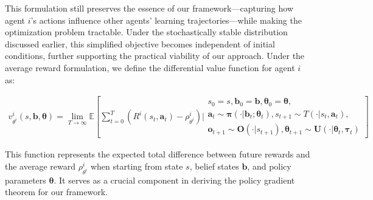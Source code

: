 \documentclass[a4paper,12pt]{report}
\begin{document}
This formulation still preserves the essence of our framework—capturing how agent $i$'s actions influence other agents' learning trajectories—while making the optimization problem tractable. Under the stochastically stable distribution discussed earlier, this simplified objective becomes independent of initial conditions, further supporting the practical viability of our approach. Under the average reward formulation, we define the differential value function for agent $i$ as:

\begin{align}
    v^i_{\theta^i}(s, \boldsymbol{b}, \boldsymbol{\theta}) = \lim_{T \to \infty} \mathbb{E}\left[ \sum_{t=0}^T \left(R^i(s_t, \boldsymbol{a}_t) - \rho^i_{\theta^i}\right) \Bigg|
    \begin{array}{c}
        s_0=s, \boldsymbol{b}_0= \boldsymbol{b}, \boldsymbol{\theta}_0= \boldsymbol{\theta}, \\
        \boldsymbol{a}_t \sim \boldsymbol{\pi}(\cdot|\boldsymbol{b}_t; \boldsymbol{\theta}_t),
        s_{t+1} \sim T(\cdot|s_t, \boldsymbol{a}_t),                                         \\
        \boldsymbol{o}_{t+1} \sim \boldsymbol{O}(\cdot|s_{t+1}),
        \boldsymbol{\theta}_{t+1} \sim \boldsymbol{U}(\cdot|\boldsymbol{\theta}_t, \boldsymbol{\tau}_t)
    \end{array}
    \right]
\end{align}

This function represents the expected total difference between future rewards and the average reward $\rho^i_{\theta^i}$ when starting from state $s$, belief states $\boldsymbol{b}$, and policy parameters $\boldsymbol{\theta}$. It serves as a crucial component in deriving the policy gradient theorem for our framework.
\end{document}

